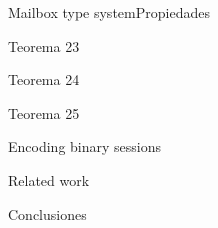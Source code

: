 \documentclass{beamer}
\begin{document}
\begin{frame}{Mailbox type system}{Propiedades}
    \begin{block}{Teorema 23}
    \end{block}
    \begin{block}{Teorema 24}
    \end{block}
    \begin{block}{Teorema 25}
    \end{block}
\end{frame}

\begin{frame}{Encoding binary sessions}
\end{frame}

\begin{frame}{Related work}
\end{frame}

\begin{frame}{Conclusiones}
\end{frame}
\end{document}
